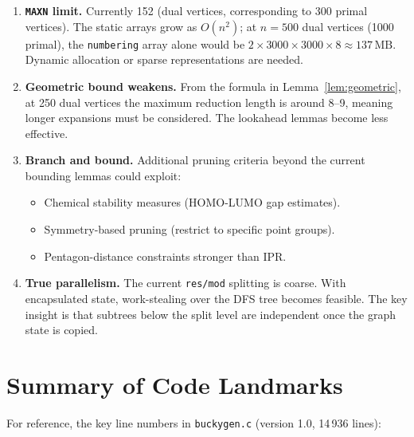 \documentclass[11pt,a4paper]{article}
\theoremstyle{definition}
\begin{document}
\begin{enumerate}[nosep]
  \item \textbf{\texttt{MAXN} limit.}  Currently 152 (dual vertices,
    corresponding to 300 primal vertices).  The static arrays grow
    as $O(n^2)$; at $n = 500$ dual vertices (1000 primal), the
    \texttt{numbering} array alone would be
    $2 \times 3000 \times 3000 \times 8 \approx 137\,\text{MB}$.
    Dynamic allocation or sparse representations are needed.

  \item \textbf{Geometric bound weakens.}  From the formula in
    Lemma~\ref{lem:geometric}, at 250 dual vertices the maximum
    reduction length is around 8--9, meaning longer expansions must be
    considered.  The lookahead lemmas become less effective.

  \item \textbf{Branch and bound.}  Additional pruning criteria
    beyond the current bounding lemmas could exploit:
    \begin{itemize}[nosep]
      \item Chemical stability measures (HOMO-LUMO gap estimates).
      \item Symmetry-based pruning (restrict to specific point groups).
      \item Pentagon-distance constraints stronger than IPR.
    \end{itemize}

  \item \textbf{True parallelism.}  The current \texttt{res/mod}
    splitting is coarse.  With encapsulated state, work-stealing over
    the DFS tree becomes feasible.  The key insight is that subtrees
    below the split level are independent once the graph state is
    copied.
\end{enumerate}

\section{Summary of Code Landmarks}
\label{sec:landmarks}

For reference, the key line numbers in \texttt{buckygen.c} (version 1.0,
14\,936 lines):
\end{document}
